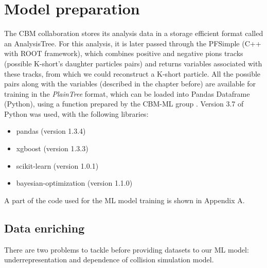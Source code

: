 \section{Model preparation}\thispagestyle{fancy}
The CBM collaboration stores its analysis data in a storage efficient format called an AnalysisTree. For this analysis, it is later passed through the PFSimple (C++ with ROOT framework),  which combines positive and negative pions tracks (possible K-short's daughter particles pairs) and returns variables associated with these tracks, from which we could reconstruct a K-short particle. All the possible pairs along with the variables (described in the chapter before) are available for training in the \emph{PlainTree} format, which can be loaded into Pandas Dataframe (Python), using a function prepared by the CBM-ML group \cite{plaintree}\cite{uproot}. Version 3.7 of Python was used, with the following libraries:
\begin{itemize}
    \item pandas (version 1.3.4)
    \item xgboost (version 1.3.3)
    \item scikit-learn (version 1.0.1)
    \item bayesian-optimization (version 1.1.0)
\end{itemize}
A part of the code used for the ML model training is shown in Appendix A.

\subsection{Data enriching}
There are two problems to tackle before providing datasets to our ML model: underrepresentation and dependence of collision simulation model.

